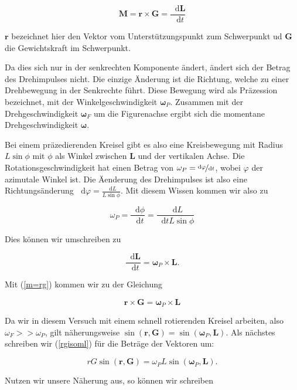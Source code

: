 \documentclass[11pt,a4paper]{article}
\newcommand{\dif}{\mathop{}\!\mathrm{d}}
\newcommand{\vphi}{\varphi}
\renewcommand{\vec}{\boldsymbol}
\begin{document}
\begin{equation}
\vec{M}=\vec{r}\times\vec{G}=\frac{\dif\vec{L}}{\dif t}\label{m=rg}
\end{equation}

$\vec{r}$ bezeichnet hier den Vektor vom Unterst\"utzungspunkt zum Schwerpunkt ud $\vec{G}$ die Gewichtskraft im Schwerpunkt.

Da dies sich nur in der senkrechten Komponente \"andert, \"andert sich der Betrag des Drehimpulses nicht. Die einzige \"Anderung ist die Richtung, welche zu einer Drehbewegung in der Senkrechte f\"uhrt. Diese Bewegung wird als Pr\"azession bezeichnet, mit der Winkelgeschwindigkeit $\vec{\omega}_P$. Zusammen mit der Drehgeschwindigkeit $\vec{\omega}_F$ um die Figurenachse ergibt sich die momentane Drehgeschwindigkeit $\vec{\omega}$.

Bei einem pr\"azedierenden Kreisel gibt es also eine Kreisbewegung mit Radius $L\sin\phi$ mit $\phi$ als Winkel zwischen $\vec{L}$ und der vertikalen Achse. Die Rotationsgeschwindigkeit hat einen Betrag von $\omega_P=\nicefrac{\dif\vphi}{\dif t}$, wobei $\vphi$ der azimutale Winkel ist. Die \"Aenderung des Drehimpulses ist also eine Richtungs\"anderung $\dif\vphi=\frac{\dif L}{L\sin\phi}$. Mit diesem Wissen kommen wir also zu

\[
\omega_P=\frac{\dif\phi}{\dif t}=\frac{\dif L}{\dif tL\sin\phi}
\]

Dies k\"onnen wir umschreiben zu

\begin{equation}
\frac{\dif\vec{L}}{\dif t}=\vec{\omega}_P\times\vec{L}.
\end{equation}

Mit (\ref{m=rg}) kommen wir zu der Gleichung

\begin{equation}
\vec{r}\times\vec{G}=\vec{\omega}_P\times\vec{L}\label{rgisoml}
\end{equation}

Da wir in diesem Versuch mit einem schnell rotierenden Kreisel arbeiten, also $\omega_F>>\omega_P$, gilt n\"aherungsweise $\sin(\vec{r},\vec{G})=\sin(\vec{\omega}_P,\vec{L})$. Als n\"achstes schreiben wir (\ref{rgisoml}) f\"ur die Betr\"age der Vektoren um:

\begin{equation}
rG\sin(\vec{r},\vec{G})=\omega_PL\sin(\vec{\omega}_P,\vec{L}).
\end{equation}

Nutzen wir unsere N\"aherung aus, so k\"onnen wir schreiben
\end{document}
